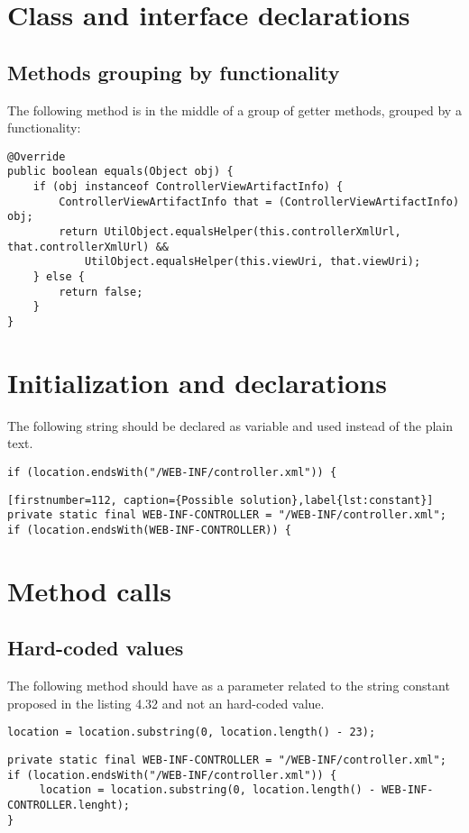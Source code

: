 \section{Class and interface declarations}
\subsection{Methods grouping by functionality}
The following method is in the middle of a group of getter methods, grouped by a functionality:
\begin{lstlisting}[firstnumber=113, caption={equals method in the middle of getters}]
@Override
public boolean equals(Object obj) {
    if (obj instanceof ControllerViewArtifactInfo) {
        ControllerViewArtifactInfo that = (ControllerViewArtifactInfo) obj;
        return UtilObject.equalsHelper(this.controllerXmlUrl, that.controllerXmlUrl) &&
            UtilObject.equalsHelper(this.viewUri, that.viewUri);
    } else {
        return false;
    }
}
\end{lstlisting}

\section{Initialization and declarations}
The following string should be declared as  variable and used instead of the plain text.
\begin{lstlisting}[firstnumber=113, caption={Constant is missing}]
if (location.endsWith("/WEB-INF/controller.xml")) {
\end{lstlisting}
\begin{lstlisting}[firstnumber=112, caption={Possible solution},label{lst:constant}]
private static final WEB-INF-CONTROLLER = "/WEB-INF/controller.xml";
if (location.endsWith(WEB-INF-CONTROLLER)) {
\end{lstlisting}

\section{Method calls}

\subsection{Hard-coded values}
The following method should have as  a parameter related to the string constant proposed in the listing 4.32 and not an hard-coded value.
\begin{lstlisting}[firstnumber=88, caption={substring invocation}]
location = location.substring(0, location.length() - 23);
\end{lstlisting}
\begin{lstlisting}[firstnumber=86, caption={substring invocation possible solution}]
private static final WEB-INF-CONTROLLER = "/WEB-INF/controller.xml";
if (location.endsWith("/WEB-INF/controller.xml")) {
     location = location.substring(0, location.length() - WEB-INF-CONTROLLER.lenght);
}
\end{lstlisting}
